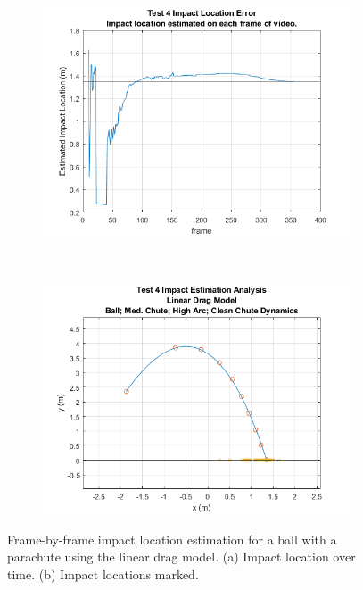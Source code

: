 \begin{figure}[t!]
    \centering
    \begin{subfigure}[t]{0.5\textwidth}
        \centering
        \includegraphics[width=\textwidth]{images/Analysis2_Test4_ImpLocPlot_LinearDrag.png}
        \caption{}
    \end{subfigure}%
    ~ 
    \begin{subfigure}[t]{0.5\textwidth}
        \centering
        \includegraphics[width=\textwidth]{images/Analysis2_Test4_ImpLocHist_LinearDrag.png}
        \caption{}
    \end{subfigure}
    \caption{\label{fig:Test4_LinearDrag_FrameByFrame} Frame-by-frame impact location estimation for a ball with a parachute using the linear drag model. (a) Impact location over time. (b) Impact locations marked.}
\end{figure}

